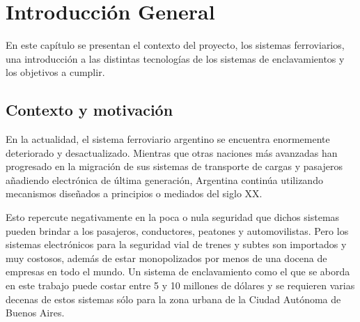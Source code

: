 
\chapter{Introducción General} %

\label{Chapter1} %
\label{IntroGeneral}


\newcommand{\keyword}[1]{\textbf{#1}}
\newcommand{\tabhead}[1]{\textbf{#1}}
\newcommand{\code}[1]{\texttt{#1}}
\newcommand{\file}[1]{\texttt{\bfseries#1}}
\newcommand{\option}[1]{\texttt{\itshape#1}}
\newcommand{\grados}{$^{\circ}$}


En este capítulo se presentan el contexto del proyecto, los sistemas ferroviarios, una introducción a las distintas tecnologías de los sistemas de enclavamientos y los objetivos a cumplir.

		
	\section{Contexto y motivación}
	
		En la actualidad, el sistema ferroviario argentino se encuentra enormemente deteriorado y desactualizado. Mientras que otras naciones más avanzadas han progresado en la migración de sus sistemas de transporte de cargas y pasajeros añadiendo electrónica de última generación, Argentina continúa utilizando mecanismos diseñados a principios o mediados del siglo XX.
				
		Esto repercute negativamente en la poca o nula seguridad que dichos sistemas pueden brindar a los pasajeros, conductores, peatones y automovilistas. Pero los sistemas electrónicos para la seguridad vial de trenes y subtes son importados y muy costosos, además de estar monopolizados por menos de una docena de empresas en todo el mundo. Un sistema de enclavamiento como el que se aborda en este trabajo puede costar entre 5 y 10 millones de dólares\citep{SIEMENS} y se requieren varias decenas de estos sistemas sólo para la zona urbana de la Ciudad Autónoma de Buenos Aires.
		
